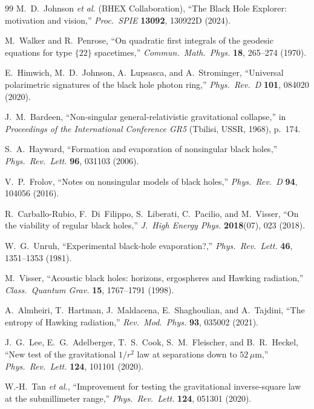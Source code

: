 \documentclass[11pt,a4paper]{article}
\theoremstyle{plain}
\theoremstyle{definition}
\theoremstyle{remark}
\numberwithin{equation}{section}
\begin{document}
\begin{thebibliography}{99}
M.~D.~Johnson \textit{et al.} (BHEX Collaboration), ``The Black Hole Explorer: motivation and vision,'' \textit{Proc.\ SPIE} \textbf{13092}, 130922D (2024).

M.~Walker and R.~Penrose, ``On quadratic first integrals of the geodesic equations for type $\{22\}$ spacetimes,'' \textit{Commun.\ Math.\ Phys.} \textbf{18}, 265--274 (1970).

E.~Himwich, M.~D.~Johnson, A.~Lupsasca, and A.~Strominger, ``Universal polarimetric signatures of the black hole photon ring,'' \textit{Phys.\ Rev.\ D} \textbf{101}, 084020 (2020).

J.~M.~Bardeen, ``Non-singular general-relativistic gravitational collapse,'' in \textit{Proceedings of the International Conference GR5} (Tbilisi, USSR, 1968), p.~174.

S.~A.~Hayward, ``Formation and evaporation of nonsingular black holes,'' \textit{Phys.\ Rev.\ Lett.} \textbf{96}, 031103 (2006).

V.~P.~Frolov, ``Notes on nonsingular models of black holes,'' \textit{Phys.\ Rev.\ D} \textbf{94}, 104056 (2016).

R.~Carballo-Rubio, F.~Di~Filippo, S.~Liberati, C.~Pacilio, and M.~Visser, ``On the viability of regular black holes,'' \textit{J.\ High Energy Phys.} \textbf{2018}(07), 023 (2018).

W.~G.~Unruh, ``Experimental black-hole evaporation?,'' \textit{Phys.\ Rev.\ Lett.} \textbf{46}, 1351--1353 (1981).

M.~Visser, ``Acoustic black holes: horizons, ergospheres and Hawking radiation,'' \textit{Class.\ Quantum Grav.} \textbf{15}, 1767--1791 (1998).

A.~Almheiri, T.~Hartman, J.~Maldacena, E.~Shaghoulian, and A.~Tajdini, ``The entropy of Hawking radiation,'' \textit{Rev.\ Mod.\ Phys.} \textbf{93}, 035002 (2021).

J.~G.~Lee, E.~G.~Adelberger, T.~S.~Cook, S.~M.~Fleischer, and B.~R.~Heckel, ``New test of the gravitational $1/r^2$ law at separations down to $52\,\mu\text{m}$,'' \textit{Phys.\ Rev.\ Lett.} \textbf{124}, 101101 (2020).

W.-H.~Tan \textit{et al.}, ``Improvement for testing the gravitational inverse-square law at the submillimeter range,'' \textit{Phys.\ Rev.\ Lett.} \textbf{124}, 051301 (2020).

\end{thebibliography}
\end{document}
